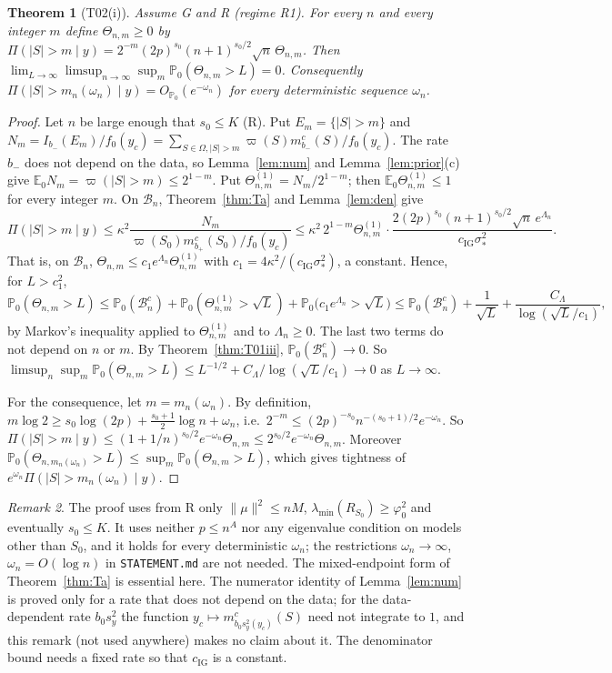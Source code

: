 \documentclass[11pt]{article}
\newtheorem{theorem}{Theorem}[section]
\theoremstyle{remark}
\newtheorem{remark}[theorem]{Remark}
\newcommand{\E}{\mathbb E}
\newcommand{\Prob}{\mathbb P}
\newcommand{\IG}{\mathrm{IG}}
\newcommand{\vp}{\varpi}
\newcommand{\Om}{\Omega}
\newcommand{\B}{\mathcal B}
\newcommand{\sy}{s_y}
\newcommand{\yc}{y_c}
\newcommand{\bm}{b_-}
\newcommand{\bp}{b_+}
\begin{document}
\begin{theorem}[T02(i)]\label{thm:T02i}
Assume G and R (regime R1). For every $n$ and every integer $m$ define $\Theta_{n,m}\ge0$ by
$\Pi(|S|>m\mid y)=2^{-m}(2p)^{s_0}(n+1)^{s_0/2}\sqrt n\,\Theta_{n,m}$. Then $\lim_{L\to\infty}\limsup_{n\to\infty}\sup_m\Prob_0(\Theta_{n,m}>L)=0$. Consequently $\Pi(|S|>m_n(\omega_n)\mid y)=O_{\Prob_0}(e^{-\omega_n})$ for every deterministic sequence $\omega_n$.
\end{theorem}
\begin{proof}
Let $n$ be large enough that $s_0\le K$ (R). Put $E_m=\{|S|>m\}$ and $N_m=I_{\bm}(E_m)/f_0(\yc)=\sum_{S\in\Om,|S|>m}\vp(S)m^c_{\bm}(S)/f_0(\yc)$. The rate $\bm$ does not depend on the data, so Lemma~\ref{lem:num} and Lemma~\ref{lem:prior}(c) give $\E_0N_m=\vp(|S|>m)\le2^{1-m}$. Put $\Theta^{(1)}_{n,m}=N_m/2^{1-m}$; then $\E_0\Theta^{(1)}_{n,m}\le1$ for every integer $m$. On $\B_n$, Theorem~\ref{thm:Ta} and Lemma~\ref{lem:den} give
\[
\Pi(|S|>m\mid y)\le\kappa^2\frac{N_m}{\vp(S_0)m^c_{\bp}(S_0)/f_0(\yc)}\le\kappa^2\,2^{1-m}\Theta^{(1)}_{n,m}\cdot\frac{2(2p)^{s_0}(n+1)^{s_0/2}\sqrt n\,e^{\Lambda_n}}{c_{\IG}\sigma_*^2}.
\]
That is, on $\B_n$, $\Theta_{n,m}\le c_1e^{\Lambda_n}\Theta^{(1)}_{n,m}$ with $c_1=4\kappa^2/(c_{\IG}\sigma_*^2)$, a constant. Hence, for $L>c_1^2$,
\[
\Prob_0(\Theta_{n,m}>L)\le\Prob_0(\B_n^c)+\Prob_0(\Theta^{(1)}_{n,m}>\sqrt L)+\Prob_0\big(c_1e^{\Lambda_n}>\sqrt L\big)
\le\Prob_0(\B_n^c)+\frac1{\sqrt L}+\frac{C_\Lambda}{\log(\sqrt L/c_1)},
\]
by Markov's inequality applied to $\Theta^{(1)}_{n,m}$ and to $\Lambda_n\ge0$. The last two terms do not depend on $n$ or $m$. By Theorem~\ref{thm:T01iii}, $\Prob_0(\B_n^c)\to0$. So $\limsup_n\sup_m\Prob_0(\Theta_{n,m}>L)\le L^{-1/2}+C_\Lambda/\log(\sqrt L/c_1)\to0$ as $L\to\infty$.

For the consequence, let $m=m_n(\omega_n)$. By definition, $m\log2\ge s_0\log(2p)+\frac{s_0+1}2\log n+\omega_n$, i.e.\ $2^{-m}\le(2p)^{-s_0}n^{-(s_0+1)/2}e^{-\omega_n}$. So $\Pi(|S|>m\mid y)\le(1+1/n)^{s_0/2}e^{-\omega_n}\Theta_{n,m}\le2^{s_0/2}e^{-\omega_n}\Theta_{n,m}$. Moreover $\Prob_0(\Theta_{n,m_n(\omega_n)}>L)\le\sup_{m}\Prob_0(\Theta_{n,m}>L)$, which gives tightness of $e^{\omega_n}\Pi(|S|>m_n(\omega_n)\mid y)$.
\end{proof}

\begin{remark}
The proof uses from R only $\|\mu\|^2\le nM$, $\lambda_{\min}(R_{S_0})\ge\varphi_0^2$ and eventually $s_0\le K$. It uses neither $p\le n^A$ nor any eigenvalue condition on models other than $S_0$, and it holds for every deterministic $\omega_n$; the restrictions $\omega_n\to\infty$, $\omega_n=O(\log n)$ in \texttt{STATEMENT.md} are not needed. The mixed-endpoint form of Theorem~\ref{thm:Ta} is essential here. The numerator identity of Lemma~\ref{lem:num} is proved only for a rate that does not depend on the data; for the data-dependent rate $b_0\sy^2$ the function $\yc\mapsto m^c_{b_0\sy^2(\yc)}(S)$ need not integrate to $1$, and this remark (not used anywhere) makes no claim about it. The denominator bound needs a fixed rate so that $c_{\IG}$ is a constant.
\end{remark}
\end{document}
